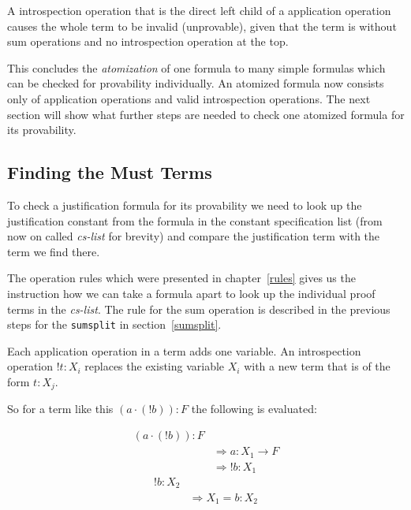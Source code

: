 \begin{assertion}
A introspection operation that is the direct left child of a application operation causes the whole term to be invalid (unprovable), given that the term is without sum operations and no introspection operation at the top.
\end{assertion}



This concludes the \emph{atomization} of one formula to many simple formulas which can be checked for provability individually. An atomized formula now consists only of application operations and valid introspection operations. The next section will show what further steps are needed to check one atomized formula for its provability.

\subsection{Finding the Must Terms}\label{chap:Algorithm.musts}
To check a justification formula for its provability we need to look up the justification constant from the formula in the constant specification list (from now on called \emph{cs-list} for brevity) and compare the justification term with the term we find there.

The operation rules which were presented in chapter~\ref{rules} gives us the instruction how we can take a formula apart to look up the individual proof terms in the \emph{cs-list}. The rule for the sum operation is described in the previous steps for the \texttt{sumsplit} in section~\ref{sumsplit}.

Each application operation in a term adds one variable. An introspection operation $!t:X_i$ replaces the existing variable $X_i$ with a new term that is of the form $t:X_j$. 

So for a term like this $(a \cdot (!b)):F$ the following is evaluated:

\begin{equation}\label{musts1}
\begin{split}
	(a \cdot (!b)): F \\
	& \Rightarrow a: X_1 \rightarrow F\\
	& \Rightarrow !b: X_1
\end{split}
\end{equation}
\begin{equation}\label{musts2}
\begin{split}
	!b: X_2 \\
	& \Rightarrow X_1 = b:X_2
\end{split}
\end{equation}

